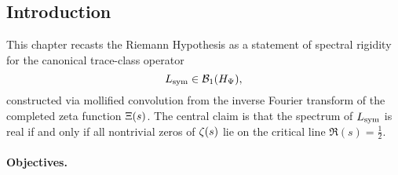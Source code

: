 \subsection*{Introduction}
\label{sec:intro_spectral_rigidity}

This chapter recasts the Riemann Hypothesis as a statement of spectral rigidity for the canonical trace-class operator
\[
L_{\mathrm{sym}} \in \mathcal{B}_1(H_{\Psi}),
\]
constructed via mollified convolution from the inverse Fourier transform of the completed zeta function \( \Xi(s) \). The central claim is that the spectrum of \( L_{\mathrm{sym}} \) is real if and only if all nontrivial zeros of \( \zeta(s) \) lie on the critical line \( \Re(s) = \tfrac{1}{2} \).

\paragraph{Objectives.}
